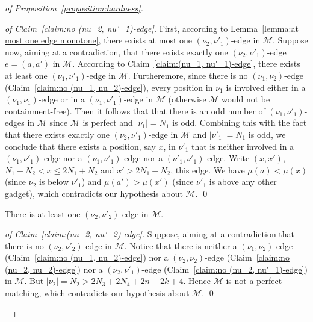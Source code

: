 \documentclass[a4paper]{llncs}
\begin{document}
\begin{proof}[of Proposition~\ref{proposition:hardness}]
  \begin{proof}[of Claim~\ref{claim:no (nu_2, nu'_1)-edge}]
    First, according to Lemma~\ref{lemma:at most one edge monotone},
    there exists at most one $(\nu_2, \nu'_1)$-edge in $\mathcal{M}$.
    Suppose now, aiming at a contradiction, that there exists
    exactly one $(\nu_2, \nu'_1)$-edge $e = (a, a')$ in $\mathcal{M}$.
    According to Claim~\ref{claim:(nu_1, nu'_1)-edge}, there exists at least
    one $(\nu_1, \nu'_1)$-edge in $\mathcal{M}$.
    Furtheremore, since
    there is no $(\nu_1, \nu_2)$-edge (Claim~\ref{claim:no (nu_1, nu_2)-edge}),
    every position in $\nu_1$ is involved either in a
    $(\nu_1, \nu_1)$-edge or in a $(\nu_1, \nu'_1)$-edge in $\mathcal{M}$
    (otherwise $\mathcal{M}$ would not be containment-free).
    Then it follows that that there is an odd number of $(\nu_1, \nu'_1)$-edges
    in $\mathcal{M}$ since $\mathcal{M}$ is perfect and $|\nu_1| = N_1$ is odd.
    Combining this with the fact that there exists exactly one $(\nu_2, \nu'_1)$-edge
    in $\mathcal{M}$ and $|\nu'_1| = N_1$ is odd,
    we conclude that there exists a position, say $x$, in $\nu'_1$
    that is neither involved in a $(\nu_1, \nu'_1)$-edge nor a $(\nu_1, \nu'_1)$-edge
    nor a $(\nu'_1, \nu'_1)$-edge.
    Write $(x, x')$, $N_1+N_2 < x \leq 2N_1 + N_2$ and $x' > 2N_1 + N_2$, this edge.
    We have $\mu(a) < \mu(x)$ (since $\nu_2$ is below $\nu'_1$)
    and $\mu(a') > \mu(x')$ (since $\nu'_1$ is above any other gadget),
    which contradicts our hypothesis about $\mathcal{M}$.
    \qed
  \end{proof}

  \begin{claim}
    \label{claim:(nu_2, nu'_2)-edge}
    There is at least one $(\nu_2, \nu'_2)$-edge in $\mathcal{M}$.
  \end{claim}

  \begin{proof}[of Claim~\ref{claim:(nu_2, nu'_2)-edge}]
    Suppose, aiming at a contradiction that there is no
    $(\nu_2, \nu'_2)$-edge in $\mathcal{M}$.
    Notice that there is neither
    a $(\nu_1, \nu_2)$-edge (Claim~\ref{claim:no (nu_1, nu_2)-edge})
    nor a $(\nu_2, \nu_2)$-edge (Claim~\ref{claim:no (nu_2, nu_2)-edge})
    nor a $(\nu_2, \nu'_1)$-edge (Claim~\ref{claim:no (nu_2, nu'_1)-edge})
    in $\mathcal{M}$.
    But $|\nu_2| = N_2 > 2N_3 + 2N_4 + 2n + 2k +4$.
    Hence $\mathcal{M}$ is not a perfect matching,
    which contradicts our hypothesis about $\mathcal{M}$.
    \qed
  \end{proof}


\end{proof}
\end{document}
